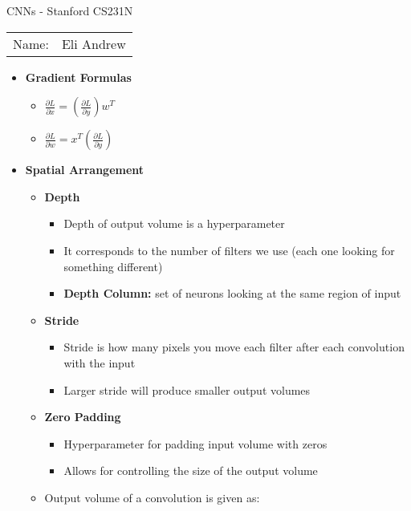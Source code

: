 \documentclass[12pt]{article}
\begin{document}
\begin{center}
{\Large CNNs - Stanford CS231N}

\begin{tabular}{rl}
Name: & Eli Andrew
\end{tabular}
\end{center}

  \begin{itemize}
    \item \textbf{Gradient Formulas}
    \begin{itemize}
        \item $\frac{\partial L}{\partial x} = (\frac{\partial L}{\partial y})w^T$
        \item $\frac{\partial L}{\partial w} = x^T(\frac{\partial L}{\partial y})$
    \end{itemize}
    \item \textbf{Spatial Arrangement}
    \begin{itemize}
        \item \textbf{Depth}
        \begin{itemize}
            \item Depth of output volume is a hyperparameter
            \item It corresponds to the number of filters we use (each one looking for something different)
            \item \textbf{Depth Column:} set of neurons looking at the same region of input
        \end{itemize}
        \item \textbf{Stride}
        \begin{itemize}
            \item Stride is how many pixels you move each filter after each convolution with the input
            \item Larger stride will produce smaller output volumes
        \end{itemize}
        \item \textbf{Zero Padding}
        \begin{itemize}
            \item Hyperparameter for padding input volume with zeros
            \item Allows for controlling the size of the output volume
        \end{itemize}
        \item Output volume of a convolution is given as:
        \begin{gather*}

\end{gather*}
\end{itemize}
\end{itemize}
\end{document}
